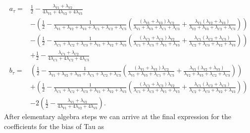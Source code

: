 {\footnotesize
\begin{align*}
    a_{\tau}=&\frac{1}{2}-\frac{\lambda_{V1}+\lambda_{V2}}{4\lambda_{V1}+4\lambda_{V2}+4\lambda_{V3}}\\
    &-\left(\frac{1}{2}-\frac{1}{\lambda_{V1}+\lambda_{V2}+\lambda_{V3}+\lambda_{C1}+\lambda_{C2}+\lambda_{C3}}\left(\frac{\left(\lambda_{V1}+\lambda_{V3}\right)\lambda_{C2}}{\lambda_{V1}+\lambda_{V3}+\lambda_{C1}+\lambda_{C3}}+\frac{\lambda_{V1}\left(\lambda_{V2}+\lambda_{V3}\right)}{\lambda_{V2}+\lambda_{V3}+\lambda_{C2}+\lambda_{C3}}\right)\right)\\
    &-\left(\frac{1}{2}-\frac{1}{\lambda_{C1}+\lambda_{C2}+\lambda_{C3}+\lambda_{V1}+\lambda_{V2}+\lambda_{V3}}\left(\frac{\left(\lambda_{C1}+\lambda_{C3}\right)\lambda_{V2}}{\lambda_{C1}+\lambda_{C3}+\lambda_{V1}+\lambda_{V3}}+\frac{\lambda_{C1}\left(\lambda_{C2}+\lambda_{C3}\right)}{\lambda_{C2}+\lambda_{C3}+\lambda_{V2}+\lambda_{V3}}\right)\right)\\
    &+\frac{1}{2}-\frac{\lambda_{C1}+\lambda_{C2}}{4\lambda_{C1}+4\lambda_{C2}+4\lambda_{C3}}\\
    b_{\tau}=&\left(\frac{1}{2}-\frac{1}{\lambda_{V1}+\lambda_{V2}+\lambda_{V3}+\lambda_{C1}+\lambda_{C2}+\lambda_{C3}}\left(\frac{\left(\lambda_{V1}+\lambda_{V3}\right)\lambda_{C2}}{\lambda_{V1}+\lambda_{V3}+\lambda_{C1}+\lambda_{C3}}+\frac{\lambda_{V1}\left(\lambda_{V2}+\lambda_{V3}\right)}{\lambda_{V2}+\lambda_{V3}+\lambda_{C2}+\lambda_{C3}}\right)\right)\\
    &+\left(\frac{1}{2}-\frac{1}{\lambda_{C1}+\lambda_{C2}+\lambda_{C3}+\lambda_{V1}+\lambda_{V2}+\lambda_{V3}}\left(\frac{\left(\lambda_{C1}+\lambda_{C3}\right)\lambda_{V2}}{\lambda_{C1}+\lambda_{C3}+\lambda_{V1}+\lambda_{V3}}+\frac{\lambda_{C1}\left(\lambda_{C2}+\lambda_{C3}\right)}{\lambda_{C2}+\lambda_{C3}+\lambda_{V2}+\lambda_{V3}}\right)\right)\\
    &-2\left(\frac{1}{2}-\frac{\lambda_{V1}+\lambda_{V2}}{4\lambda_{V1}+4\lambda_{V2}+4\lambda_{V3}}\right).
\end{align*}}
After elementary algebra steps we can arrive at the final expression for the coefficients for the bias of Tau as
